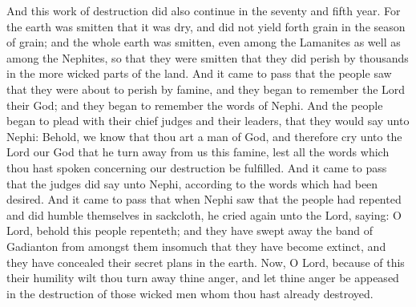 And this work of destruction did also continue in the seventy and fifth year. For the earth was smitten that it was dry, and did not yield forth grain in the season of grain; and the whole earth was smitten, even among the Lamanites as well as among the Nephites, so that they were smitten that they did perish by thousands in the more wicked parts of the land.
\bverse \iffalse And it came to pass that the people saw that they were about to perish by famine, and they began to remember the Lord their God; and they began to remember the words of Nephi. \fi
And it came to pass that the people saw that they were about to perish by famine, and they began to remember the Lord their God; and they began to remember the words of Nephi.
\bverse \iffalse And the people began to plead with their chief judges and their leaders, that they would say unto Nephi: Behold, we know that thou art a man of God, and therefore cry unto the Lord our God that he turn away from us this famine, lest all the words which thou hast spoken concerning our destruction be fulfilled. \fi
And the people began to plead with their chief judges and their leaders, that they would say unto Nephi: Behold, we know that thou art a man of God, and therefore cry unto the Lord our God that he turn away from us this famine, lest all the words which thou hast spoken concerning our destruction be fulfilled.
\bverse \iffalse And it came to pass that the judges did say unto Nephi, according to the words which had been desired. And it came to pass that when Nephi saw that the people had repented and did humble themselves in sackcloth, he cried again unto the Lord, saying: \fi
And it came to pass that the judges did say unto Nephi, according to the words which had been desired. And it came to pass that when Nephi saw that the people had repented and did humble themselves in sackcloth, he cried again unto the Lord, saying:
\bverse \iffalse O Lord, behold this people repenteth; and they have swept away the band of Gadianton from amongst them insomuch that they have become extinct, and they have concealed their secret plans in the earth. \fi
O Lord, behold this people repenteth; and they have swept away the band of Gadianton from amongst them insomuch that they have become extinct, and they have concealed their secret plans in the earth.
\bverse \iffalse Now, O Lord, because of this their humility wilt thou turn away thine anger, and let thine anger be appeased in the destruction of those wicked men whom thou hast already destroyed. \fi
Now, O Lord, because of this their humility wilt thou turn away thine anger, and let thine anger be appeased in the destruction of those wicked men whom thou hast already destroyed.
